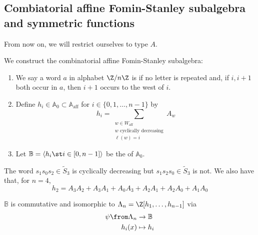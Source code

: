 \documentclass[11pt,leqno,oneside]{amsart}
\numberwithin{thm}{section}
\renewcommand{\W}{W}
\newcommand{\Waff}{\W_{\text{aff}}}
\newcommand{\A}{\mathbb{A}}
\newcommand{\Aaff}{\A_{\text{aff}}}
\newcommand{\B}{\mathbb{B}}
\newcommand{\eS}{\tilde{S}}
\newcommand{\sym}{\Lambda}
\begin{document}
\subsection{Combiatorial affine Fomin-Stanley subalgebra and symmetric
  functions}
From now on, we will restrict ourselves to type \(A\).
\begin{defn}
  We construct the combinatorial affine Fomin-Stanley subalgebra:
  \begin{enumerate}
  \item We say a word \(a\) in alphabet \(\Z/n\Z\) is  if no letter is repeated and, if \(i,i+1\) both
    occur in \(a\), then \(i+1\) occurs to the west of \(i\). 
  \item Define \(h_i \in \A_0 \subset \Aaff\) for \(i \in \{0,1,\ldots,n-1\}\) by
    \[
      h_i = \sum_{\substack{w \in \Waff \\ w \text{ cyclically decreasing} \\ \ell(w) = i}} A_w
    \]
  \item Let \(\B = \langle h_i \st i \in [0,n-1] \rangle\) be the
     of \(\A_0\).
  \end{enumerate}
\end{defn}
\begin{example}
  The word \(s_1s_0s_2 \in \eS_3\) is cyclically decreasing but \(s_1
  s_2 s_0 \in \eS_3\) is not. We also have that, for \(n=4\), \[
    h_2 = A_3 A_2 + A_3 A_1 + A_0 A_3 + A_2 A_1 + A_2 A_0 + A_1 A_0
  \]
\end{example}
\begin{prop}
  \(\B\) is commutative and isomorphic to \(\sym_n =
  \Z[h_1,\ldots,h_{n-1}]\) via
  \begin{align*}
    \psi \from \sym_n & \to \B \\
    h_i(x) & \mapsto h_i
  \end{align*}
\end{prop}
\end{document}
